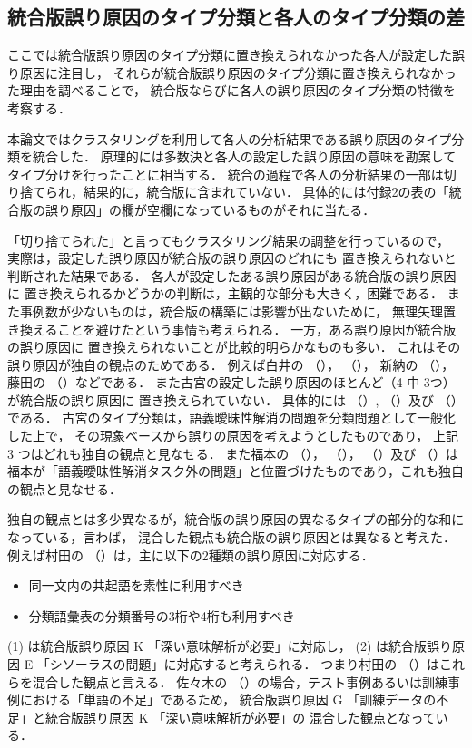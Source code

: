 \documentclass[japanese]{jnlp_1.4}
\begin{document}
\subsection{統合版誤り原因のタイプ分類と各人のタイプ分類の差}

ここでは統合版誤り原因のタイプ分類に置き換えられなかった各人が設定した誤り原因に注目し，
それらが統合版誤り原因のタイプ分類に置き換えられなかった理由を調べることで，
統合版ならびに各人の誤り原因のタイプ分類の特徴を考察する．

本論文ではクラスタリングを利用して各人の分析結果である誤り原因のタイプ分類を統合した．
原理的には多数決と各人の設定した誤り原因の意味を勘案してタイプ分けを行ったことに相当する．
統合の過程で各人の分析結果の一部は切り捨てられ，結果的に，統合版に含まれていない．
具体的には付録2の表の「統合版の誤り原因」の欄が空欄になっているものがそれに当たる．

「切り捨てられた」と言ってもクラスタリング結果の調整を行っているので，
実際は，設定した誤り原因が統合版の誤り原因のどれにも
置き換えられないと判断された結果である．
各人が設定したある誤り原因がある統合版の誤り原因に
置き換えられるかどうかの判断は，主観的な部分も大きく，困難である．
また事例数が少ないものは，統合版の構築には影響が出ないために，
無理矢理置き換えることを避けたという事情も考えられる．
一方，ある誤り原因が統合版の誤り原因に
置き換えられないことが比較的明らかなものも多い．
これはその誤り原因が独自の観点のためである．
例えば白井の （）， （），
新納の （），
藤田の （）などである．
また古宮の設定した誤り原因のほとんど（4 中 3つ）が統合版の誤り原因に
置き換えられていない．
具体的には （）, （）及び （）である．
古宮のタイプ分類は，語義曖昧性解消の問題を分類問題として一般化した上で，
その現象ベースから誤りの原因を考えようとしたものであり，
上記 3 つはどれも独自の観点と見なせる．
また福本の （）， （）， （）及び （）は
福本が「語義曖昧性解消タスク外の問題」と位置づけたものであり，これも独自の観点と見なせる．


独自の観点とは多少異なるが，統合版の誤り原因の異なるタイプの部分的な和になっている，言わば，
混合した観点も統合版の誤り原因とは異なると考えた．
例えば村田の （）は，主に以下の2種類の誤り原因に対応する．

\begin{itemize}
      \item[(1)] 同一文内の共起語を素性に利用すべき
      \item[(2)] 分類語彙表の分類番号の3桁や4桁も利用すべき
\end{itemize}
(1) は統合版誤り原因 K 「深い意味解析が必要」に対応し，
(2) は統合版誤り原因 E 「シソーラスの問題」に対応すると考えられる．
つまり村田の （）はこれらを混合した観点と言える．
佐々木の （）の場合，テスト事例あるいは訓練事例における「単語の不足」であるため，
統合版誤り原因 G 「訓練データの不足」と統合版誤り原因 K 「深い意味解析が必要」の
混合した観点となっている．
\end{document}
